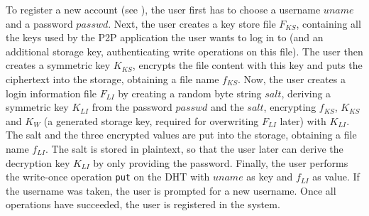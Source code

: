 To register a new account (see ), the user first has to choose
a username $uname$ 
and a password $passwd$.
Next, the user creates a key store file $F_{KS}$, containing all the keys used 
by the P2P application the user wants to log in to (and an additional storage 
key, authenticating write operations on this file). %
The user then creates a symmetric key $K_{KS}$, encrypts the file content with this key and puts the ciphertext into the storage, obtaining a file name $f_{KS}$.
Now, the user creates a login information file $F_{LI}$ by creating a random byte string $salt$, deriving a symmetric key $K_{LI}$ from the password $passwd$ and the $salt$, encrypting $f_{KS}$, $K_{KS}$ and $K_W$ (a generated storage key, required for overwriting $F_{LI}$ later) with $K_{LI}$. The salt and the three encrypted values are put into the storage, obtaining a file name $f_{LI}$.
The salt is stored in plaintext, so that the user later can derive the decryption key $K_{LI}$ by only providing the password.
Finally, the user performs the write-once operation \texttt{put} on the DHT
with $uname$ as key and $f_{LI}$ as value. If the username was taken, the user
is prompted for a new username.
Once all operations have succeeded, the user is registered in the system.




